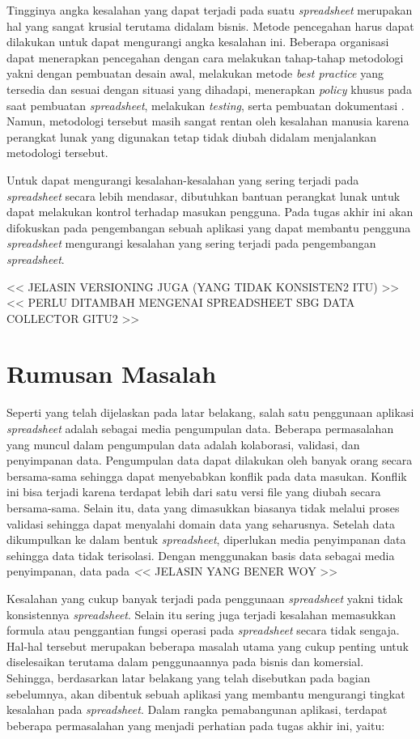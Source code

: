 Tingginya angka kesalahan yang dapat terjadi pada suatu \textit{spreadsheet} merupakan hal yang sangat krusial terutama didalam bisnis. Metode pencegahan harus dapat dilakukan untuk dapat mengurangi angka kesalahan ini. Beberapa organisasi dapat menerapkan pencegahan dengan cara melakukan tahap-tahap metodologi yakni dengan pembuatan desain awal, melakukan metode \textit{best practice} yang tersedia dan sesuai dengan situasi yang dihadapi, menerapkan \textit{policy} khusus pada saat pembuatan \textit{spreadsheet}, melakukan \textit{testing}, serta pembuatan dokumentasi \citep{EUSPRIGBestPractice}. Namun, metodologi tersebut masih sangat rentan oleh kesalahan manusia karena perangkat lunak yang digunakan tetap tidak diubah didalam menjalankan metodologi tersebut. 

Untuk dapat mengurangi kesalahan-kesalahan yang sering terjadi pada \textit{spreadsheet} secara lebih mendasar, dibutuhkan bantuan perangkat lunak untuk dapat melakukan kontrol terhadap masukan pengguna. Pada tugas akhir ini akan difokuskan pada pengembangan sebuah aplikasi yang dapat membantu pengguna \textit{spreadsheet} mengurangi kesalahan yang sering terjadi pada pengembangan \textit{spreadsheet}.

<< JELASIN VERSIONING JUGA (YANG TIDAK KONSISTEN2 ITU) >>
<< PERLU DITAMBAH MENGENAI SPREADSHEET SBG DATA COLLECTOR GITU2 >>

\section{Rumusan Masalah}

Seperti yang telah dijelaskan pada latar belakang, salah satu penggunaan aplikasi \textit{spreadsheet} adalah sebagai media pengumpulan data. Beberapa permasalahan yang muncul dalam pengumpulan data adalah kolaborasi, validasi, dan penyimpanan data. Pengumpulan data dapat dilakukan oleh banyak orang secara bersama-sama sehingga dapat menyebabkan konflik pada data masukan. Konflik ini bisa terjadi karena terdapat lebih dari satu versi file yang diubah secara bersama-sama. Selain itu, data yang dimasukkan biasanya tidak melalui proses validasi sehingga dapat menyalahi domain data yang seharusnya. Setelah data dikumpulkan ke dalam bentuk \textit{spreadsheet}, diperlukan media penyimpanan data sehingga data tidak terisolasi. Dengan menggunakan basis data sebagai media penyimpanan, data pada \textit


<< JELASIN YANG BENER WOY >>

Kesalahan yang cukup banyak terjadi pada penggunaan \textit{spreadsheet} yakni tidak konsistennya \textit{spreadsheet}. Selain itu sering juga terjadi kesalahan memasukkan formula atau penggantian fungsi operasi pada \textit{spreadsheet} secara tidak sengaja. Hal-hal tersebut merupakan beberapa masalah utama yang cukup penting untuk diselesaikan terutama dalam penggunaannya pada bisnis dan komersial. Sehingga, berdasarkan latar belakang yang telah disebutkan pada bagian sebelumnya, akan dibentuk sebuah aplikasi yang membantu mengurangi tingkat kesalahan pada \textit{spreadsheet}. Dalam rangka pemabangunan aplikasi, terdapat beberapa permasalahan yang menjadi perhatian pada tugas akhir ini, yaitu:

